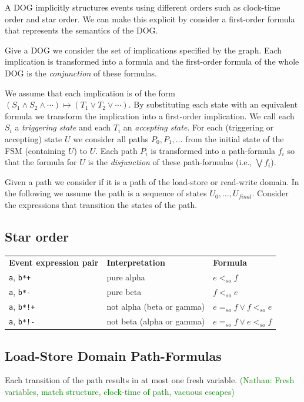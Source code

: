 \documentclass[10pt]{paper}
\newcommand{\NCComment}[1]{\textcolor{green}{(Nathan: #1)}}
\begin{document}
A DOG implicitly structures events using different orders such as clock-time order and star order.
%
We can make this explicit by consider a first-order formula that represents the semantics of the DOG.

Give a DOG we consider the set of implications specified by the graph.
%
Each implication is transformed into a formula and the first-order formula of the whole DOG is the \emph{conjunction} of these formulas.

We assume that each implication is of the form $(S_1 \wedge S_2 \wedge \cdots) \mapsto (T_1 \vee T_2 \vee \cdots)$.
%
By substituting each state with an equivalent formula we transform the implication into a first-order implication.
%
We call each $S_i$ a \emph{triggering state} and each $T_i$ an \emph{accepting state}.
%
For each (triggering or accepting) state $U$ we consider all paths $P_0, P_1, \dots$ from the initial state of the FSM (containing $U$) to $U$.
%
Each path $P_i$ is transformed into a path-formula $f_i$ so that the formula for $U$ is the \emph{disjunction} of these path-formulas (i.e., $\bigvee f_i$).

Given a path we consider if it is a path of the load-store or read-write domain.
%
In the following we assume the path is a sequence of states $U_0, \dots, U_{final}$.
%
Consider the expressions that transition the states of the path.
%
\subsection{Star order}

\begin{tabular}{lll}
\textbf{Event expression pair} & \textbf{Interpretation}   & \textbf{Formula} \\
\texttt{a}, \texttt{b*+}       & pure alpha                & $e <_{so} f$ \\
\texttt{a}, \texttt{b*-}       & pure beta                 & $f <_{so} e$ \\
\texttt{a}, \texttt{b*!+}      & not alpha (beta or gamma) & $e =_{so} f \vee f <_{so} e$ \\
\texttt{a}, \texttt{b*!-}      & not beta (alpha or gamma) & $e =_{so} f \vee e <_{so} f$ \\
\end{tabular}

\subsection{Load-Store Domain Path-Formulas}
%
Each transition of the path results in at most one fresh variable.
%
\NCComment{Fresh variables, match structure, clock-time of path, vacuous escapes}
\end{document}
